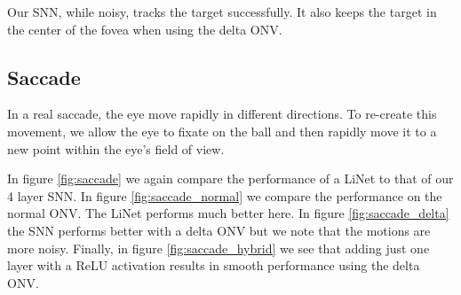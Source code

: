 \documentclass[../taasin.tex]{subfiles}
\begin{document}
Our SNN, while noisy, tracks the target successfully. It also keeps the target in the center of the fovea when using the delta ONV.


\subsection{Saccade}

In a real saccade, the eye move rapidly in different directions. To re-create this movement, we allow the eye to fixate on the ball and then rapidly move it to a new point within the eye's field of view. 

In figure \ref{fig:saccade} we again compare the performance of a LiNet to that of our 4 layer SNN.
In figure \ref{fig:saccade_normal} we compare the performance on the normal ONV. The LiNet performs much better here. In figure \ref{fig:saccade_delta} the SNN performs better with a delta ONV but we note that the motions are more noisy. Finally, in figure \ref{fig:saccade_hybrid} we see that adding just one layer with a ReLU activation results in smooth performance using the delta ONV.
\end{document}
